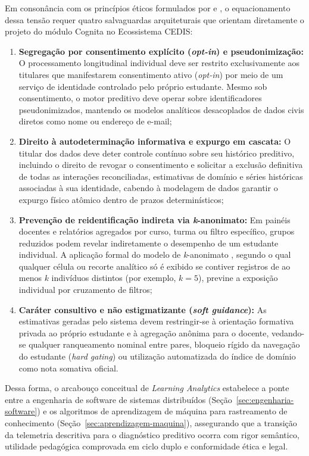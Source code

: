 Em consonância com os princípios éticos formulados por  e , o equacionamento dessa tensão requer quatro salvaguardas arquiteturais que orientam diretamente o projeto do módulo Cognita no Ecossistema CEDIS:
\begin{enumerate}
    \item \textbf{Segregação por consentimento explícito (\textit{opt-in}) e pseudonimização:} O processamento longitudinal individual deve ser restrito exclusivamente aos titulares que manifestarem consentimento ativo (\textit{opt-in}) por meio de um serviço de identidade controlado pelo próprio estudante. Mesmo sob consentimento, o motor preditivo deve operar sobre identificadores pseudonimizados, mantendo os modelos analíticos desacoplados de dados civis diretos como nome ou endereço de e-mail;
    \item \textbf{Direito à autodeterminação informativa e expurgo em cascata:} O titular dos dados deve deter controle contínuo sobre seu histórico preditivo, incluindo o direito de revogar o consentimento e solicitar a exclusão definitiva de todas as interações reconciliadas, estimativas de domínio e séries históricas associadas à sua identidade, cabendo à modelagem de dados garantir o expurgo físico atômico dentro de prazos determinísticos;
    \item \textbf{Prevenção de reidentificação indireta via \textit{k}-anonimato:} Em painéis docentes e relatórios agregados por curso, turma ou filtro específico, grupos reduzidos podem revelar indiretamente o desempenho de um estudante individual. A aplicação formal do modelo de \textit{k}-anonimato \cite{sweeney_k-anonymity_2002}, segundo o qual qualquer célula ou recorte analítico só é exibido se contiver registros de ao menos $k$ indivíduos distintos (por exemplo, $k = 5$), previne a exposição individual por cruzamento de filtros;
    \item \textbf{Caráter consultivo e não estigmatizante (\textit{soft guidance}):} As estimativas geradas pelo sistema devem restringir-se à orientação formativa privada ao próprio estudante e à agregação anônima para o docente, vedando-se qualquer ranqueamento nominal entre pares, bloqueio rígido da navegação do estudante (\textit{hard gating}) ou utilização automatizada do índice de domínio como nota somativa oficial.
\end{enumerate}

Dessa forma, o arcabouço conceitual de \textit{Learning Analytics} estabelece a ponte entre a engenharia de software de sistemas distribuídos (Seção~\ref{sec:engenharia-software}) e os algoritmos de aprendizagem de máquina para rastreamento de conhecimento (Seção~\ref{sec:aprendizagem-maquina}), assegurando que a transição da telemetria descritiva para o diagnóstico preditivo ocorra com rigor semântico, utilidade pedagógica comprovada em ciclo duplo e conformidade ética e legal.


